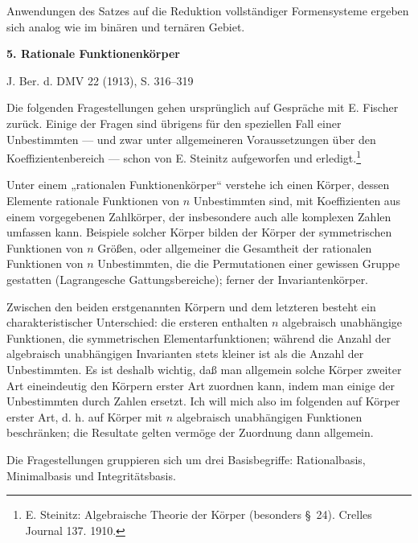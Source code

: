 \documentclass[11pt]{article}
\begin{document}
Anwendungen des Satzes auf die Reduktion vollst\"andiger Formensysteme ergeben sich analog wie im bin\"aren und tern\"aren Gebiet.


\clearpage
\providecommand{\Kfield}{\mathfrak{K}}
\providecommand{\Ssys}{\mathfrak{S}}
\providecommand{\Mfield}{\mathfrak{M}}
\providecommand{\tq}{\tau}
\providecommand{\ds}{\displaystyle}

\begin{center}
{\Large\bfseries 5. Rationale Funktionenkörper}\par
\vspace{1.2em}
J. Ber. d. DMV 22 (1913), S. 316--319
\end{center}

\vspace{2em}

Die folgenden Fragestellungen gehen ursprünglich auf Gespräche mit E. Fischer zurück. Einige der Fragen sind übrigens für den speziellen Fall einer Unbestimmten --- und zwar unter allgemeineren Voraussetzungen über den Koeffizientenbereich --- schon von E. Steinitz aufgeworfen und erledigt.\footnote{E. Steinitz: Algebraische Theorie der Körper (besonders \S\ 24). Crelles Journal 137. 1910.}

Unter einem „rationalen Funktionenkörper“ verstehe ich einen Körper, dessen Elemente rationale Funktionen von $n$ Unbestimmten sind, mit Koeffizienten aus einem vorgegebenen Zahlkörper, der insbesondere auch alle komplexen Zahlen umfassen kann. Beispiele solcher Körper bilden der Körper der symmetrischen Funktionen von $n$ Größen, oder allgemeiner die Gesamtheit der rationalen Funktionen von $n$ Unbestimmten, die die Permutationen einer gewissen Gruppe gestatten (Lagrangesche Gattungsbereiche); ferner der Invariantenkörper.

Zwischen den beiden erstgenannten Körpern und dem letzteren besteht ein charakteristischer Unterschied: die ersteren enthalten $n$ algebraisch unabhängige Funktionen, die symmetrischen Elementarfunktionen; während die Anzahl der algebraisch unabhängigen Invarianten stets kleiner ist als die Anzahl der Unbestimmten. Es ist deshalb wichtig, daß man allgemein solche Körper zweiter Art eineindeutig den Körpern erster Art zuordnen kann, indem man einige der Unbestimmten durch Zahlen ersetzt. Ich will mich also im folgenden auf Körper erster Art, d. h. auf Körper mit $n$ algebraisch unabhängigen Funktionen beschränken; die Resultate gelten vermöge der Zuordnung dann allgemein.

Die Fragestellungen gruppieren sich um drei Basisbegriffe: Rationalbasis, Minimalbasis und Integritätsbasis.
\end{document}
